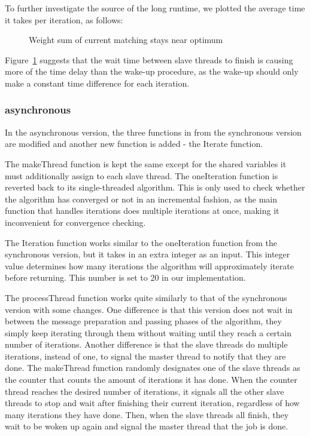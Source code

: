 To further investigate the source of the long runtime, we plotted the average time it takes per iteration, as follows:
\begin{figure}
\centering
\caption{Weight sum of current matching stays near optimum}
\label{fig:bd2}
\end{figure}

Figure~\ref{fig:bd2} suggests that the wait time between slave threads to finish is causing more of the time delay than the wake-up procedure, as the wake-up should only make a constant time difference for each iteration.

\subsubsection{asynchronous}
In the asynchronous version, the three functions in from the synchronous version are modified and another new function is added - the Iterate function.

The makeThread function is kept the same except for the shared variables it must additionally assign to each slave thread.
The oneIteration function is reverted back to its single-threaded algorithm. This is only used to check whether the algorithm has converged or not in an incremental fashion, as the main function that handles iterations does multiple iterations at once, making it inconvenient for convergence checking.

The Iteration function works similar to the oneIteration function from the synchronous version, but it takes in an extra integer as an input. This integer value determines how many iterations the algorithm will approximately iterate before returning. This number is set to 20 in our implementation.

The processThread function works quite similarly to that of the synchronous version with some changes. One difference is that this version does not wait in between the message preparation and passing phases of the algorithm, they simply keep iterating through them without waiting until they reach a certain number of iterations. Another difference is that the slave threads do multiple iterations, instead of one, to signal the master thread to notify that they are done. The makeThread function randomly designates one of the slave threads as the counter that counts the amount of iterations it has done. When the counter thread reaches the desired number of iterations, it signals all the other slave threads to stop and wait after finishing their current iteration, regardless of how many iterations they have done. Then, when the slave threads all finish, they wait to be woken up again and signal the master thread that the job is done.

